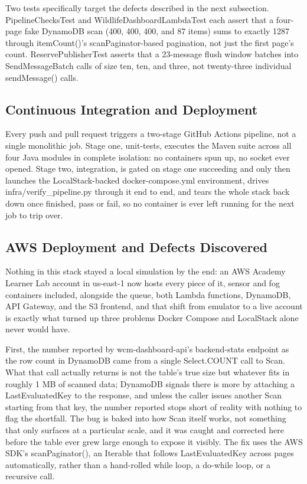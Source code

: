 \documentclass[conference,a4paper]{IEEEtran}
\begin{document}
Two tests specifically target the defects described in the next subsection. PipelineChecksTest and WildlifeDashboardLambdaTest each assert that a four-page fake DynamoDB scan (400, 400, 400, and 87 items) sums to exactly 1287 through itemCount()'s scanPaginator-based pagination, not just the first page's count. ReservePublisherTest asserts that a 23-message flush window batches into SendMessageBatch calls of size ten, ten, and three, not twenty-three individual sendMessage() calls.

\subsection{Continuous Integration and Deployment}

Every push and pull request triggers a two-stage GitHub Actions pipeline, not a single monolithic job. Stage one, unit-tests, executes the Maven suite across all four Java modules in complete isolation: no containers spun up, no socket ever opened. Stage two, integration, is gated on stage one succeeding and only then launches the LocalStack-backed docker-compose.yml environment, drives infra/verify\_pipeline.py through it end to end, and tears the whole stack back down once finished, pass or fail, so no container is ever left running for the next job to trip over.

\subsection{AWS Deployment and Defects Discovered}

Nothing in this stack stayed a local simulation by the end: an AWS Academy Learner Lab account in us-east-1 now hosts every piece of it, sensor and fog containers included, alongside the queue, both Lambda functions, DynamoDB, API Gateway, and the S3 frontend, and that shift from emulator to a live account is exactly what turned up three problems Docker Compose and LocalStack alone never would have.

First, the number reported by wcm-dashboard-api's backend-stats endpoint as the row count in DynamoDB came from a single Select.COUNT call to Scan. What that call actually returns is not the table's true size but whatever fits in roughly 1 MB of scanned data; DynamoDB signals there is more by attaching a LastEvaluatedKey to the response, and unless the caller issues another Scan starting from that key, the number reported stops short of reality with nothing to flag the shortfall. The bug is baked into how Scan itself works, not something that only surfaces at a particular scale, and it was caught and corrected here before the table ever grew large enough to expose it visibly. The fix uses the AWS SDK's scanPaginator(), an Iterable that follows LastEvaluatedKey across pages automatically, rather than a hand-rolled while loop, a do-while loop, or a recursive call.
\end{document}
